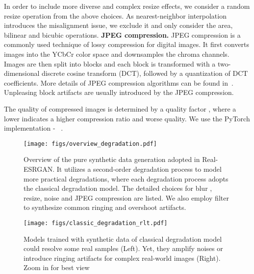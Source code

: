\documentclass[10pt,twocolumn,letterpaper]{article}
\begin{document}
In order to include more diverse and complex resize effects, we consider a random resize operation from the above choices. As nearest-neighbor interpolation introduces the misalignment issue, we exclude it and only consider the area, bilinear and bicubic operations.
\newline\newline
\noindent\textbf{JPEG compression.}
JPEG compression is a commonly used technique of lossy compression for digital images.
It first converts images into the YCbCr color space and downsamples the chroma channels.
Images are then split into  blocks and each block is transformed with a two-dimensional discrete cosine transform (DCT), followed by a quantization of DCT coefficients. More details of JPEG compression algorithms can be found in~\cite{shin2017jpeg}.
Unpleasing block artifacts are usually introduced by the JPEG compression.

The quality of compressed images is determined by a quality factor , where a lower  indicates a higher compression ratio and worse quality.
We use the PyTorch implementation - ~\cite{diffjpeg}.


\begin{figure*}
	\vspace{-0.8cm}
	\begin{center}
\texttt{[image: figs/overview\_degradation.pdf]}
	\end{center}
	\vspace{-0.6cm}
	\caption{Overview of the pure synthetic data generation adopted in Real-ESRGAN. It utilizes a second-order degradation process to model more practical degradations, where each degradation process adopts the classical degradation model.
	The detailed choices for blur , resize, noise and JPEG compression are listed. We also employ  filter to synthesize common ringing and overshoot artifacts.}
	\label{fig:overview_degradation}
	\vspace{-0.5cm}
\end{figure*}

\begin{figure}[h]
	\vspace{-0.2cm}
	\begin{center}
\texttt{[image: figs/classic\_degradation\_rlt.pdf]}
	\end{center}
	\vspace{-0.6cm}
	\caption{Models trained with synthetic data of classical degradation model could resolve some real samples (Left). Yet, they amplify noises or introduce ringing artifacts for complex real-world images (Right). Zoom in for best view}
	\label{fig:classic_degradation_rlt}
	\vspace{-0.6cm}
\end{figure}
\end{document}
